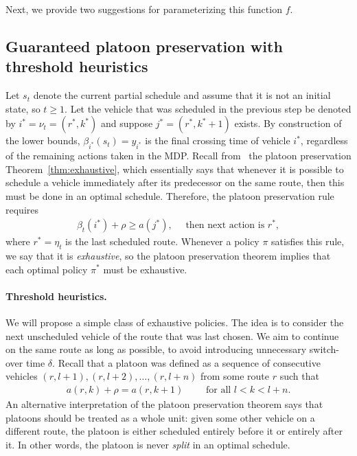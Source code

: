 \documentclass{report}
\theoremstyle{definition}
\theoremstyle{plain}
\begin{document}
Next, we provide two suggestions for parameterizing this function $f$.

\subsection{Guaranteed platoon preservation with threshold heuristics}\label{sec:threshold}

Let $s_t$ denote the current partial schedule and assume that it is
not an initial state, so $t \geq 1$. Let the vehicle that was scheduled in the
previous step be denoted by $i^* = \nu_t = (r^*, k^*)$ and suppose $j^* = (r^*, k^*+1)$ exists.
%
By construction of the lower bounds, $\beta_{i^*}(s_t) = y_{i^*}$ is the final crossing
time of vehicle $i^*$, regardless of the remaining actions taken in the MDP.
%
Recall from~ the platoon preservation
Theorem~\ref{thm:exhaustive}, which essentially says that whenever it is
possible to schedule a vehicle immediately after its predecessor on the same
route, then this must be done in an optimal schedule.
%
Therefore, the platoon preservation rule requires
\begin{align}\label{eq:rule-exhaustive}\tag{exhaustive}
  \beta_t(i^*) + \rho \geq a(j^*), \quad \text{  then next action is } r^* , 
\end{align}
where $r^* = \eta_t$ is the last scheduled route.
%
Whenever a policy $\pi$ satisfies this rule, we say that it is
\emph{exhaustive}, so the platoon preservation theorem implies that each optimal
policy $\pi^*$ must be exhaustive.


\paragraph{Threshold heuristics.}

We will propose a simple class of exhaustive policies.
%
The idea is to consider the next unscheduled vehicle of the route that was
last chosen. We aim to continue on the same route as long as
possible, to avoid introducing unnecessary switch-over time $\delta$.
%
Recall that a platoon was defined as a sequence of consecutive vehicles
$(r, l+1), (r, l+2), \dots, (r, l+n)$ from some route $r$ such that
\begin{align*}
  a(r,k) + \rho = a(r, k+1)  \quad \quad \text{ for all } l < k < l + n.
\end{align*}
%
An alternative interpretation of the platoon preservation theorem says that
platoons should be treated as a whole unit: given some other vehicle on a
different route, the platoon is either scheduled entirely before it or entirely
after it. In other words, the platoon is never \emph{split} in an optimal
schedule.
\end{document}
